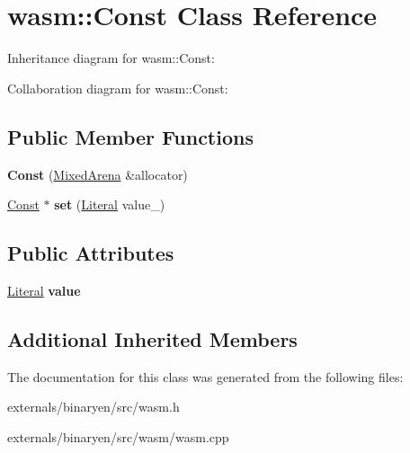 \hypertarget{classwasm_1_1_const}{}\section{wasm\+:\+:Const Class Reference}
\label{classwasm_1_1_const}


Inheritance diagram for wasm\+:\+:Const\+:


Collaboration diagram for wasm\+:\+:Const\+:
\subsection*{Public Member Functions}
\begin{DoxyCompactItemize}
\item 
\mbox{\label{classwasm_1_1_const_ac0fd690c2f5c86b4aad7571b876467dc}} 
{\bfseries Const} (\mbox{\hyperlink{struct_mixed_arena}{Mixed\+Arena}} \&allocator)
\item 
\mbox{\label{classwasm_1_1_const_abef0653d9ef12d7c0b52fab1e7449e8b}} 
\mbox{\hyperlink{classwasm_1_1_const}{Const}} $\ast$ {\bfseries set} (\mbox{\hyperlink{classwasm_1_1_literal}{Literal}} value\+\_\+)
\end{DoxyCompactItemize}
\subsection*{Public Attributes}
\begin{DoxyCompactItemize}
\item 
\mbox{\label{classwasm_1_1_const_a3f20767e25a17c8595bafcbd26727a66}} 
\mbox{\hyperlink{classwasm_1_1_literal}{Literal}} {\bfseries value}
\end{DoxyCompactItemize}
\subsection*{Additional Inherited Members}


The documentation for this class was generated from the following files\+:\begin{DoxyCompactItemize}
\item 
externals/binaryen/src/wasm.\+h\item 
externals/binaryen/src/wasm/wasm.\+cpp\end{DoxyCompactItemize}
